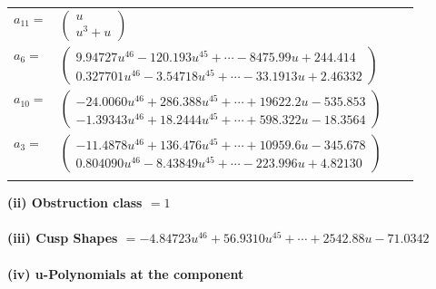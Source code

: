\documentclass[1p]{elsarticle_modified}
\theoremstyle{definition}
\begin{document}
\begin{tabular}{m{7pt} m{180pt} m{7pt} m{180pt} }
\flushright $a_{11}=$&$\begin{pmatrix}u\\u^3+u\end{pmatrix}$ \\
\flushright $a_{6}=$&$\begin{pmatrix}9.94727 u^{46}-120.193 u^{45}+\cdots-8475.99 u+244.414\\0.327701 u^{46}-3.54718 u^{45}+\cdots-33.1913 u+2.46332\end{pmatrix}$ \\
\flushright $a_{10}=$&$\begin{pmatrix}-24.0060 u^{46}+286.388 u^{45}+\cdots+19622.2 u-535.853\\-1.39343 u^{46}+18.2444 u^{45}+\cdots+598.322 u-18.3564\end{pmatrix}$ \\
\flushright $a_{3}=$&$\begin{pmatrix}-11.4878 u^{46}+136.476 u^{45}+\cdots+10959.6 u-345.678\\0.804090 u^{46}-8.43849 u^{45}+\cdots-223.996 u+4.82130\end{pmatrix}$\\&\end{tabular}
\flushleft \textbf{(ii) Obstruction class $= 1$}\\~\\
\flushleft \textbf{(iii) Cusp Shapes $= -4.84723 u^{46}+56.9310 u^{45}+\cdots+2542.88 u-71.0342$}\\~\\
\newpage\renewcommand{\arraystretch}{1}
\flushleft \textbf{(iv) u-Polynomials at the component}\newline \\
\end{document}
